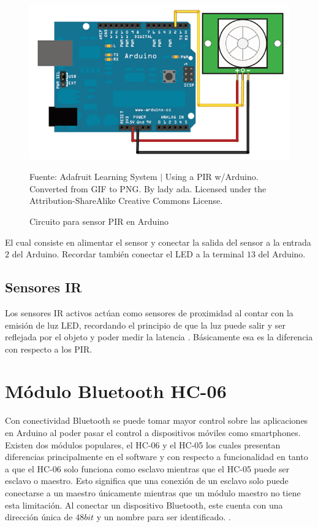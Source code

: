 \documentclass[conference]{IEEEtran}
\begin{document}
\begin{figure}[H]
\centering
\includegraphics[width=0.3\paperwidth]{images/proximity-pir-arduino-circuit}
\caption{Circuito para sensor PIR en Arduino}
\footnotesize
Fuente: Adafruit Learning System $\mid$ Using a PIR w/Arduino. Converted from GIF to PNG. By lady ada. Licensed under the Attribution-ShareAlike Creative Commons License.
\end{figure}

El cual consiste en alimentar el sensor y conectar la salida del sensor a la entrada $2$ del Arduino. Recordar también conectar el LED a la terminal $13$ del Arduino.

\subsection{Sensores IR}

Los sensores IR activos actúan como sensores de proximidad al contar con la emisión de luz LED, recordando el principio de que la luz puede salir y ser reflejada por el objeto  y poder medir la latencia . Básicamente esa es la diferencia con respecto a los PIR.

\section{Módulo Bluetooth HC-06}

Con conectividad Bluetooth se puede tomar mayor control sobre las aplicaciones en Arduino al poder pasar el control a dispositivos móviles como smartphones. Existen dos módulos populares, el HC-06 y el HC-05 los cuales presentan diferencias principalmente en el software y con respecto a funcionalidad en tanto a que el HC-06 solo funciona como esclavo mientras que el HC-05 puede ser esclavo o maestro. Esto significa que una conexión de un esclavo solo puede conectarse a un maestro únicamente mientras que un módulo maestro no tiene esta limitación. Al conectar un dispositivo Bluetooth, este cuenta con una dirección única de $48bit$ y un nombre para ser identificado. \cite{prometecnet-2019}.
\end{document}
